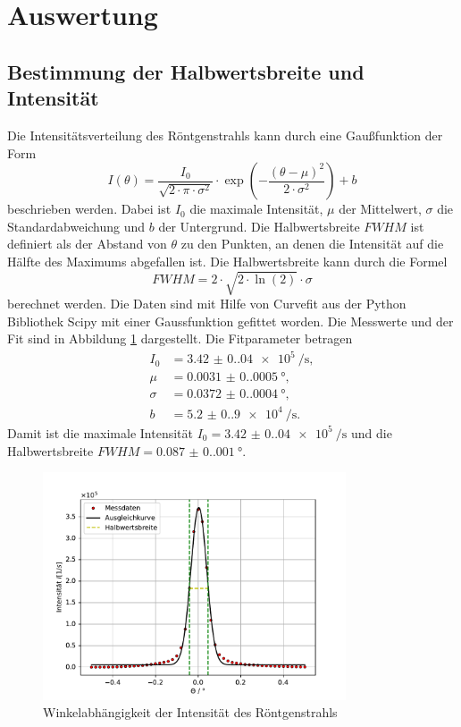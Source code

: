 \section{Auswertung}
\label{sec:Auswertung}
\subsection{Bestimmung der Halbwertsbreite und Intensität}
Die Intensitätsverteilung des Röntgenstrahls kann durch eine Gaußfunktion der Form
\begin{equation}
    I(\theta)=\frac{I_0}{\sqrt{2\cdot \pi \cdot \sigma^2}} \cdot \exp\left(-\frac{(\theta-\mu)^2}{2\cdot \sigma^2}\right)+b
\end{equation}
beschrieben werden. Dabei ist $I_0$ die maximale Intensität, $\mu$ der Mittelwert, $\sigma$ die Standardabweichung und $b$ der Untergrund. Die Halbwertsbreite $FWHM$ ist definiert als der Abstand von $\theta$ zu den Punkten, an denen die Intensität auf die Hälfte des Maximums abgefallen ist. Die Halbwertsbreite kann durch die Formel
\begin{equation}
    FWHM = 2\cdot \sqrt{2\cdot \ln(2)}\cdot \sigma
\end{equation}
berechnet werden. Die Daten sind mit Hilfe von Curvefit aus der Python Bibliothek Scipy \cite{scipy} mit einer Gaussfunktion gefittet worden.
Die Messwerte und der Fit sind in Abbildung \ref{fig:Detectorscan} dargestellt. Die Fitparameter betragen
\begin{align*}
    I_0 &= \SI{3.42(0.04)e5}{\per\second}, \\
    \mu &= \SI{0.0031(0.0005)}{\degree}, \\
    \sigma &= \SI{0.0372(0.0004)}{\degree}, \\
    b &= \SI{5.2(0.9)e4}{\per\second}.
\end{align*}
Damit ist die maximale Intensität $I_0=\SI{3.42(0.04)e5}{\per\second}$ und die Halbwertsbreite $FWHM = \SI{0.087(0.001)}{\degree}$.
\begin{figure}[H]
    \centering
    \includegraphics[width=0.8\textwidth]{plots/Detectorscan.pdf}
    \caption{Winkelabhängigkeit der Intensität des Röntgenstrahls}
    \label{fig:Detectorscan}
\end{figure}
